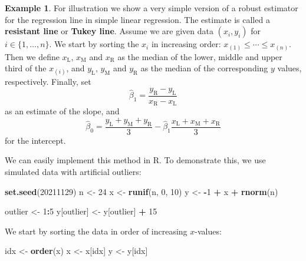 \documentclass[
  a4paper,
]{article}
\newenvironment{Shaded}{\begin{snugshade}}{\end{snugshade}}
\newcommand{\DecValTok}[1]{\textcolor[rgb]{0.00,0.00,0.81}{#1}}
\newcommand{\FunctionTok}[1]{\textcolor[rgb]{0.13,0.29,0.53}{\textbf{#1}}}
\newcommand{\NormalTok}[1]{#1}
\newcommand{\OtherTok}[1]{\textcolor[rgb]{0.56,0.35,0.01}{#1}}
\newcommand{\SpecialCharTok}[1]{\textcolor[rgb]{0.81,0.36,0.00}{\textbf{#1}}}
\theoremstyle{definition}
\theoremstyle{definition}
\newtheorem{example}{Example}[section]
\theoremstyle{definition}
\theoremstyle{definition}
\theoremstyle{remark}
\begin{document}
\begin{example}
\protect\hypertarget{exm:resistant-line}{}\label{exm:resistant-line}For illustration we show a very simple version of a robust estimator
for the regression line in simple linear regression. The estimate
is called a \textbf{resistant line} or \textbf{Tukey line}. Assume we are
given data \((x_i, y_i)\) for \(i \in \{1, \ldots, n\}\). We start by sorting
the \(x_i\) in increasing order: \(x_{(1)} \leq \cdots \leq x_{(n)}\).
Then we define \(x_\mathrm{L}\), \(x_\mathrm{M}\) and \(x_\mathrm{R}\)
as the median of the lower, middle and upper third of the \(x_{(i)}\),
and \(y_\mathrm{L}\), \(y_\mathrm{M}\) and \(y_\mathrm{R}\) as the median
of the corresponding \(y\) values, respectively. Finally, set
\begin{equation*}
  \hat\beta_1
  = \frac{y_\mathrm{R} - y_\mathrm{L}}{x_\mathrm{R} - x_\mathrm{L}}
\end{equation*}
as an estimate of the slope, and
\begin{equation*}
  \hat\beta_0
  = \frac{y_\mathrm{L} + y_\mathrm{M} + y_\mathrm{R}}{3}
      - \hat\beta_1 \frac{x_\mathrm{L} + x_\mathrm{M} + x_\mathrm{R}}{3}
\end{equation*}
for the intercept.

We can easily implement this method in R. To demonstrate this,
we use simulated data with artificial outliers:

\begin{Shaded}
\begin{Highlighting}[]
\FunctionTok{set.seed}\NormalTok{(}\DecValTok{20211129}\NormalTok{)}
\NormalTok{n }\OtherTok{\textless{}{-}} \DecValTok{24}
\NormalTok{x }\OtherTok{\textless{}{-}} \FunctionTok{runif}\NormalTok{(n, }\DecValTok{0}\NormalTok{, }\DecValTok{10}\NormalTok{)}
\NormalTok{y }\OtherTok{\textless{}{-}} \SpecialCharTok{{-}}\DecValTok{1} \SpecialCharTok{+}\NormalTok{ x }\SpecialCharTok{+} \FunctionTok{rnorm}\NormalTok{(n)}

\NormalTok{outlier }\OtherTok{\textless{}{-}} \DecValTok{1}\SpecialCharTok{:}\DecValTok{5}
\NormalTok{y[outlier] }\OtherTok{\textless{}{-}}\NormalTok{ y[outlier] }\SpecialCharTok{+} \DecValTok{15}
\end{Highlighting}
\end{Shaded}

We start by sorting the data in order of increasing \(x\)-values:

\begin{Shaded}
\begin{Highlighting}[]
\NormalTok{idx }\OtherTok{\textless{}{-}} \FunctionTok{order}\NormalTok{(x)}
\NormalTok{x }\OtherTok{\textless{}{-}}\NormalTok{ x[idx]}
\NormalTok{y }\OtherTok{\textless{}{-}}\NormalTok{ y[idx]}
\end{Highlighting}
\end{Shaded}


\end{example}
\end{document}

